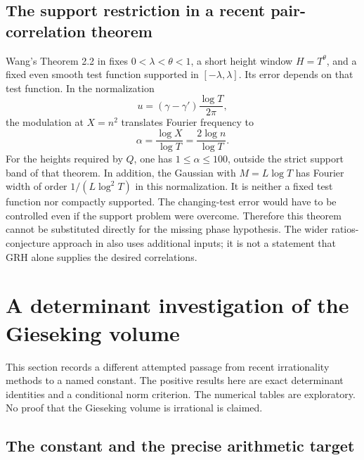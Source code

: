 \documentclass[11pt,a4paper]{article}
\theoremstyle{definition}
\theoremstyle{remark}
\begin{document}
\subsection{The support restriction in a recent pair-correlation theorem}
\label{f-sub-pair-correlation-support}

Wang's Theorem 2.2 in \cite{f-wang} fixes
$0<\lambda<\theta<1$, a short height window $H=T^\theta$, and a fixed
even smooth test function supported in $[-\lambda,\lambda]$.  Its
error depends on that test function.  In the normalization
\[
 u=(\gamma-\gamma')\frac{\log T}{2\pi},
\]
the modulation at $X=n^2$ translates Fourier frequency to
\begin{equation}
 \alpha=\frac{\log X}{\log T}=\frac{2\log n}{\log T}.
 \label{f-eq-frequency-shift}
\end{equation}
For the heights required by $Q$, one has $1\le\alpha\le100$, outside
the strict support band of that theorem.  In addition, the Gaussian with
$M=L\log T$ has Fourier width of order $1/(L\log^2T)$ in this
normalization.  It is neither a fixed test function nor compactly
supported.  The changing-test error would have to be controlled even if
the support problem were overcome.  Therefore this theorem cannot be
substituted directly for the missing phase hypothesis.  The wider
ratios-conjecture approach in \cite{f-gwx} also uses additional inputs;
it is not a statement that GRH alone supplies the desired correlations.

\section{A determinant investigation of the Gieseking volume}
\label{f-sec-gieseking}

This section records a different attempted passage from recent
irrationality methods to a named constant.  The positive results here are
exact determinant identities and a conditional norm criterion.  The
numerical tables are exploratory.  No proof that the Gieseking volume is
irrational is claimed.

\subsection{The constant and the precise arithmetic target}
\label{f-sub-volume-constant}
\end{document}
